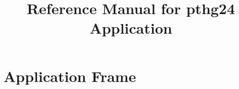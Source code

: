 \documentclass[a4paper]{book}
\title{Reference Manual for pthg24 Application}
\begin{document}
\maketitle
\frontmatter
\tableofcontents
\listoffigures
\listoftables
\mainmatter

\part{Application Frame}





\backmatter
\end{document}
